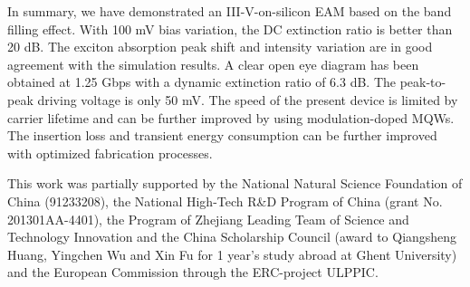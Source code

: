 \documentclass[aip,apl,reprint,a4paper]{revtex4-1}
\begin{document}
In summary, we have demonstrated an III-V-on-silicon EAM based on the band filling effect. With 100 mV bias variation, the DC extinction ratio is better than 20 dB. The exciton absorption peak shift and intensity variation are in good agreement with the simulation results. A clear open eye diagram has been obtained at 1.25 Gbps with a dynamic extinction ratio of 6.3 dB. The peak-to-peak driving voltage is only 50 mV. The speed of the present device is limited by carrier lifetime and can be further improved by using modulation-doped MQWs. The insertion loss and transient energy consumption can be further improved with optimized fabrication processes. 

\begin{acknowledgments}
This work was partially supported by the National Natural Science Foundation of China (91233208), the National High-Tech R\&D Program of China (grant No. 201301AA-4401), the Program of Zhejiang Leading Team of Science and Technology Innovation and the China Scholarship Council (award to Qiangsheng Huang, Yingchen Wu and Xin Fu for 1 year’s study abroad at Ghent University) and the European Commission through the ERC-project ULPPIC.
\end{acknowledgments}


\end{document}
